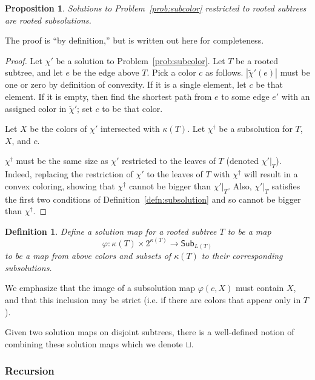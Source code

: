 \documentclass{amsart}
\newcommand{\subcol}{\chi'}
\newcommand{\altcol}{\chi^{\dag}}
\newcommand{\subcolt}{\tilde{\chi}'}
\newcommand{\subcolS}{\mathsf{Sub}}
\newcommand{\subcolST}{\subcolS_{L(T)}}
\newcommand{\subunion}{\sqcup}
\newcommand{\cut}{\kappa}
\newtheorem{prop}{Proposition}
\newtheorem{defn}{Definition}
\begin{document}
\begin{prop}
  \label{prop:subsolution}
  Solutions to Problem~\ref{prob:subcolor} restricted to rooted subtrees are rooted subsolutions.
\end{prop}

The proof is ``by definition,'' but is written out here for completeness.

\begin{proof}
  Let $\subcol$ be a solution to Problem~\ref{prob:subcolor}.
  Let $T$ be a rooted subtree, and let $e$ be the edge above $T$.
  Pick a color $c$ as follows.
  $|\subcolt(e)|$ must be one or zero by definition of convexity.
  If it is a single element, let $c$ be that element.
  If it is empty, then find the shortest path from $e$ to some edge $e'$ with an assigned color in $\subcolt$; set $c$ to be that color.

  Let $X$ be the colors of $\subcol$ intersected with $\cut(T)$.
  Let $\altcol$ be a subsolution for $T$, $X$, and $c$.

  $\altcol$ must be the same size as $\subcol$ restricted to the leaves of $T$ (denoted $\subcol|_T$).
  Indeed, replacing the restriction of $\subcol$ to the leaves of $T$ with $\altcol$ will result in a convex coloring, showing that $\altcol$ cannot be bigger than $\subcol|_T$.
  Also, $\subcol|_T$ satisfies the first two conditions of Definition~\ref{defn:subsolution} and so cannot be bigger than $\altcol$.
\end{proof}

\begin{defn}
  Define a solution map for a rooted subtree $T$ to be a map
  \[
    \varphi: \cut(T) \times 2^{\cut(T)} \rightarrow \subcolST
  \]
  to be a map from above colors and subsets of $\cut(T)$ to their corresponding subsolutions.
\end{defn}
We emphasize that the image of a subsolution map $\varphi(c,X)$ must contain $X$, and that this inclusion may be strict (i.e. if there are colors that appear only in $T$).

Given two solution maps on disjoint subtrees, there is a well-defined notion of combining these solution maps which we denote $\subunion$.


\subsubsection{Recursion}
\end{document}
